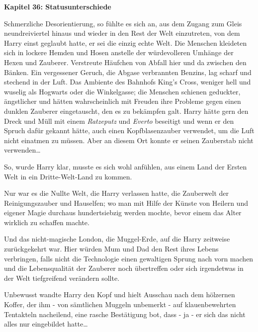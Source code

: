 

\hypertarget{statusunterschiede}{%

\textbf{Kapitel 36: Statusunterschiede}

Schmerzliche Desorientierung, so fühlte es sich an, aus dem Zugang zum Gleis neundreiviertel hinaus und wieder in den Rest der Welt einzutreten, von dem Harry einst geglaubt hatte, er sei die einzig echte Welt. Die Menschen kleideten sich in lockere Hemden und Hosen anstelle der würdevolleren Umhänge der Hexen und Zauberer. Verstreute Häufchen von Abfall hier und da zwischen den Bänken. Ein vergessener Geruch, die Abgase verbrannten Benzins, lag scharf und stechend in der Luft. Das Ambiente des Bahnhofs King's Cross, weniger hell und wuselig als Hogwarts oder die Winkelgasse; die Menschen schienen geduckter, ängstlicher und hätten wahrscheinlich mit Freuden ihre Probleme gegen einen dunklen Zauberer eingetauscht, den es zu bekämpfen galt. Harry hätte gern den Dreck und Müll mit einem \emph{Ratzeputz} und \emph{Everto} beseitigt und wenn er den Spruch dafür gekannt hätte, auch einen Kopfblasenzauber verwendet, um die Luft nicht einatmen zu müssen. Aber an diesem Ort konnte er seinen Zauberstab nicht verwenden…

So, wurde Harry klar, musste es sich wohl anfühlen, aus einem Land der Ersten Welt in ein Dritte-Welt-Land zu kommen.

Nur war es die Nullte Welt, die Harry verlassen hatte, die Zauberwelt der Reinigungszauber und Hauselfen; wo man mit Hilfe der Künste von Heilern und eigener Magie durchaus hundertsiebzig werden mochte, bevor einem das Alter wirklich zu schaffen machte.

Und das nicht-magische London, die Muggel-Erde, auf die Harry zeitweise zurückgekehrt war. Hier würden Mum und Dad den Rest ihres Lebens verbringen, falls nicht die Technologie einen gewaltigen Sprung nach vorn machen und die Lebensqualität der Zauberer noch übertreffen oder sich irgendetwas in der Welt tiefgreifend verändern sollte.

Unbewusst wandte Harry den Kopf und hielt Ausschau nach dem hölzernen Koffer, der ihm - von sämtlichen Muggeln unbemerkt - auf klauenbewehrten Tentakteln nacheilend, eine rasche Bestätigung bot, dass - ja - er sich das nicht alles nur eingebildet hatte…

}

